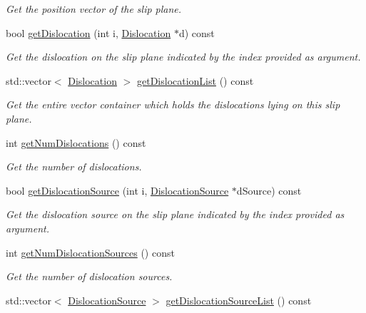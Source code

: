 \begin{DoxyCompactItemize}
\begin{DoxyCompactList}\small\item\em \-Get the position vector of the slip plane. \end{DoxyCompactList}\item 
bool \hyperlink{classSlipPlane_ae1c9a31425cacb758a10353d7b3cbc35}{get\-Dislocation} (int i, \hyperlink{classDislocation}{\-Dislocation} $\ast$d) const 
\begin{DoxyCompactList}\small\item\em \-Get the dislocation on the slip plane indicated by the index provided as argument. \end{DoxyCompactList}\item 
std\-::vector$<$ \hyperlink{classDislocation}{\-Dislocation} $>$ \hyperlink{classSlipPlane_a16b894e5cecbd0e11f050c287de22b8d}{get\-Dislocation\-List} () const 
\begin{DoxyCompactList}\small\item\em \-Get the entire vector container which holds the dislocations lying on this slip plane. \end{DoxyCompactList}\item 
int \hyperlink{classSlipPlane_a2a0f9231caee51d9a65a9bfa09e7dd31}{get\-Num\-Dislocations} () const 
\begin{DoxyCompactList}\small\item\em \-Get the number of dislocations. \end{DoxyCompactList}\item 
bool \hyperlink{classSlipPlane_ae2c01b55973912d6c0f7b077bfd7c1f5}{get\-Dislocation\-Source} (int i, \hyperlink{classDislocationSource}{\-Dislocation\-Source} $\ast$d\-Source) const 
\begin{DoxyCompactList}\small\item\em \-Get the dislocation source on the slip plane indicated by the index provided as argument. \end{DoxyCompactList}\item 
int \hyperlink{classSlipPlane_ad4f5bd8181c49601396d0b897501d544}{get\-Num\-Dislocation\-Sources} () const 
\begin{DoxyCompactList}\small\item\em \-Get the number of dislocation sources. \end{DoxyCompactList}\item 
std\-::vector$<$ \hyperlink{classDislocationSource}{\-Dislocation\-Source} $>$ \hyperlink{classSlipPlane_abd591180a3381b89d09ccd4b7aec1688}{get\-Dislocation\-Source\-List} () const 

\end{DoxyCompactItemize}
